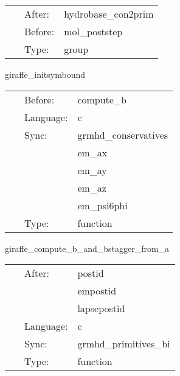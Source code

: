 \hspace{5mm}

 \begin{tabular*}{160mm}{cll} 
~ & After:  & hydrobase\_con2prim \\ 
~ & Before:  & mol\_poststep \\ 
~ & Type:  & group \\ 
\end{tabular*} 


\vspace{5mm}


\hspace{5mm} giraffe\_initsymbound 

\hspace{5mm}{\it schedule symmetries -- actually just a placeholder function to ensure prolongations / processor syncs are done before outer boundaries are updated. } 


\hspace{5mm}

 \begin{tabular*}{160mm}{cll} 
~ & Before:  & compute\_b \\ 
~ & Language:  & c \\ 
~ & Sync:  & grmhd\_conservatives \\ 
~& ~ &em\_ax\\ 
~& ~ &em\_ay\\ 
~& ~ &em\_az\\ 
~& ~ &em\_psi6phi\\ 
~ & Type:  & function \\ 
\end{tabular*} 


\vspace{5mm}


\hspace{5mm} giraffe\_compute\_b\_and\_bstagger\_from\_a 

\hspace{5mm}{\it compute b and b\_stagger from a sync: grmhd\_primitives\_bi } 


\hspace{5mm}

 \begin{tabular*}{160mm}{cll} 
~ & After:  & postid \\ 
~& ~ &empostid\\ 
~& ~ &lapsepostid\\ 
~ & Language:  & c \\ 
~ & Sync:  & grmhd\_primitives\_bi \\ 
~ & Type:  & function \\ 
\end{tabular*} 


